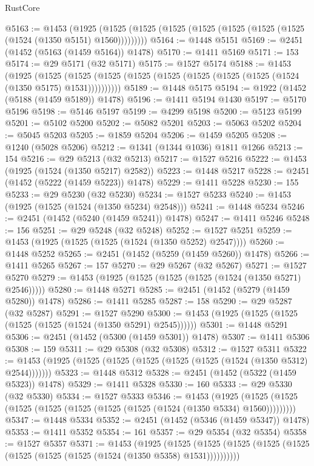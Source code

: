 \begin{lexlean}{RustCore}
\begin{coremodule}
@5163 := @1453
    (@1925 (@1525 (@1525 (@1525 (@1525 (@1525 (@1525 (@1525 (@1524 (@1350 @5151) @1560)))))))))
@5164 := @1448 @5151
@5169 := @2451 (@1452 (@5163 (@1459 @5164)) @1478)
@5170 := @1411 @5169
@5171 := 153
@5174 := @29 @5171 (@32 @5171)
@5175 := @1527 @5174
@5188 := @1453
    (@1925
      (@1525 (@1525 (@1525 (@1525 (@1525 (@1525 (@1525 (@1525 (@1524 (@1350 @5175) @1531))))))))))
@5189 := @1448 @5175
@5194 := @1922 (@1452 (@5188 (@1459 @5189)) @1478)
@5196 := @1411 @5194 @1430
@5197 := @5170 @5196
@5198 := @5146 @5197
@5199 := @4299 @5198
@5200 := @5123 @5199
@5201 := @5102 @5200
@5202 := @5082 @5201
@5203 := @5063 @5202
@5204 := @5045 @5203
@5205 := @1859 @5204
@5206 := @1459 @5205
@5208 := @1240 (@5028 @5206)
@5212 := @1341 (@1344 @1036) @1811 @1266
@5213 := 154
@5216 := @29 @5213 (@32 @5213)
@5217 := @1527 @5216
@5222 := @1453 (@1925 (@1524 (@1350 @5217) @2582))
@5223 := @1448 @5217
@5228 := @2451 (@1452 (@5222 (@1459 @5223)) @1478)
@5229 := @1411 @5228
@5230 := 155
@5233 := @29 @5230 (@32 @5230)
@5234 := @1527 @5233
@5240 := @1453 (@1925 (@1525 (@1524 (@1350 @5234) @2548)))
@5241 := @1448 @5234
@5246 := @2451 (@1452 (@5240 (@1459 @5241)) @1478)
@5247 := @1411 @5246
@5248 := 156
@5251 := @29 @5248 (@32 @5248)
@5252 := @1527 @5251
@5259 := @1453 (@1925 (@1525 (@1525 (@1524 (@1350 @5252) @2547))))
@5260 := @1448 @5252
@5265 := @2451 (@1452 (@5259 (@1459 @5260)) @1478)
@5266 := @1411 @5265
@5267 := 157
@5270 := @29 @5267 (@32 @5267)
@5271 := @1527 @5270
@5279 := @1453 (@1925 (@1525 (@1525 (@1525 (@1524 (@1350 @5271) @2546)))))
@5280 := @1448 @5271
@5285 := @2451 (@1452 (@5279 (@1459 @5280)) @1478)
@5286 := @1411 @5285
@5287 := 158
@5290 := @29 @5287 (@32 @5287)
@5291 := @1527 @5290
@5300 := @1453 (@1925 (@1525 (@1525 (@1525 (@1525 (@1524 (@1350 @5291) @2545))))))
@5301 := @1448 @5291
@5306 := @2451 (@1452 (@5300 (@1459 @5301)) @1478)
@5307 := @1411 @5306
@5308 := 159
@5311 := @29 @5308 (@32 @5308)
@5312 := @1527 @5311
@5322 := @1453 (@1925 (@1525 (@1525 (@1525 (@1525 (@1525 (@1524 (@1350 @5312) @2544)))))))
@5323 := @1448 @5312
@5328 := @2451 (@1452 (@5322 (@1459 @5323)) @1478)
@5329 := @1411 @5328
@5330 := 160
@5333 := @29 @5330 (@32 @5330)
@5334 := @1527 @5333
@5346 := @1453
    (@1925 (@1525 (@1525 (@1525 (@1525 (@1525 (@1525 (@1525 (@1524 (@1350 @5334) @1560)))))))))
@5347 := @1448 @5334
@5352 := @2451 (@1452 (@5346 (@1459 @5347)) @1478)
@5353 := @1411 @5352
@5354 := 161
@5357 := @29 @5354 (@32 @5354)
@5358 := @1527 @5357
@5371 := @1453
    (@1925
      (@1525 (@1525 (@1525 (@1525 (@1525 (@1525 (@1525 (@1525 (@1524 (@1350 @5358) @1531))))))))))

\end{coremodule}
\end{lexlean}
